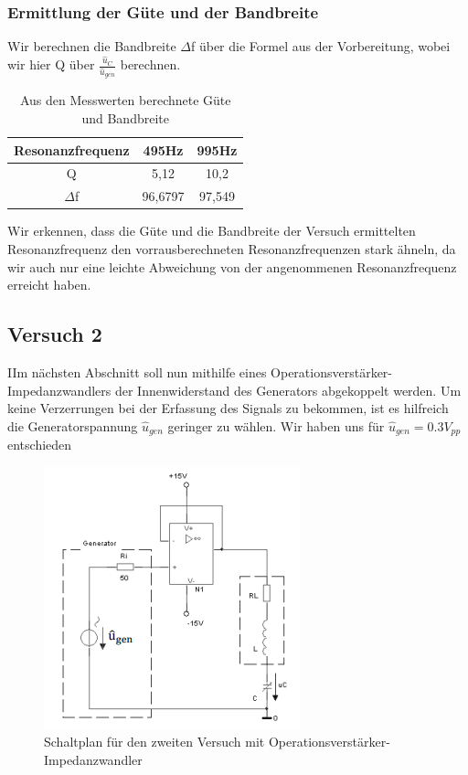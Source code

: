 \documentclass{article}
\begin{document}
\subsubsection{Ermittlung der Güte und der Bandbreite}

Wir berechnen die Bandbreite $\Delta$f über die Formel aus der Vorbereitung, wobei wir hier
Q über $\frac{\hat{u}_C}{\hat{u}_{gen}}$ berechnen.

\begin{table}[h]
  \begin{center}
    \begin{tabular}{|c|c|c|}
      \hline
      Resonanzfrequenz & 495Hz   & 995Hz  \\
      \hline
      Q                & 5,12    & 10,2   \\
      \hline
      $\Delta$f        & 96,6797 & 97,549 \\
      \hline
    \end{tabular}
    \caption{Aus den Messwerten berechnete Güte und Bandbreite}
    \label{tab:eMGB}
  \end{center}
\end{table}

Wir erkennen, dass die Güte und die Bandbreite der Versuch ermittelten Resonanzfrequenz den vorrausberechneten Resonanzfrequenzen
stark ähneln, da wir auch nur eine leichte Abweichung von der angenommenen Resonanzfrequenz erreicht haben.

\newpage

\subsection{Versuch 2}

\begin{task}
  IIm nächsten Abschnitt soll nun mithilfe eines Operationsverstärker-Impedanzwandlers
  der Innenwiderstand des Generators abgekoppelt werden. Um keine Verzerrungen bei der Erfassung
  des Signals zu bekommen, ist es hilfreich die Generatorspannung $\hat{u}_{gen}$ geringer zu wählen.
  Wir haben uns für $\hat{u}_{gen} = 0.3V_{pp}$ entschieden
\end{task}
\begin{figure}[h]
  \begin{center}
    \includegraphics{../assets/images/ETP3/Versuch2Schaltplan.PNG}
    \caption{Schaltplan für den zweiten Versuch mit Operationsverstärker-Impedanzwandler}
  \end{center}
\end{figure}
\end{document}
